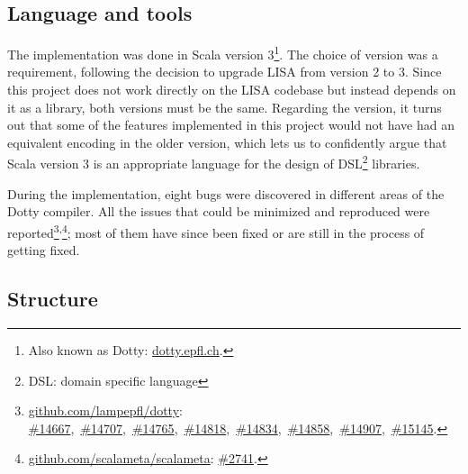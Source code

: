 \subsection{Language and tools}

The implementation was done in Scala version 3\footnote{Also known as Dotty: \href{https://dotty.epfl.ch}{dotty.epfl.ch}.}. The choice of version was a requirement, following the decision to upgrade LISA from version 2 to 3. Since this project does not work directly on the LISA codebase but instead depends on it as a library, both versions must be the same. Regarding the version, it turns out that some of the features implemented in this project would not have had an equivalent encoding in the older version, which lets us to confidently argue that Scala version 3 is an appropriate language for the design of DSL\footnote{DSL: domain specific language} libraries.

During the implementation, eight bugs were discovered in different areas of the Dotty compiler. All the issues that could be minimized and reproduced were reported\footnote{
\href{https://github.com/lampepfl/dotty}{github.com/lampepfl/dotty}:
\href{https://github.com/lampepfl/dotty/issues/14667}{\#14667},\
\href{https://github.com/lampepfl/dotty/issues/14707}{\#14707},\
\href{https://github.com/lampepfl/dotty/issues/14765}{\#14765},\
\href{https://github.com/lampepfl/dotty/issues/14818}{\#14818},\
\href{https://github.com/lampepfl/dotty/issues/14834}{\#14834},\
\href{https://github.com/lampepfl/dotty/issues/14858}{\#14858},\
\href{https://github.com/lampepfl/dotty/issues/14907}{\#14907},\
\href{https://github.com/lampepfl/dotty/issues/15145}{\#15145}.
}\textsuperscript{,}\footnote{
\href{https://github.com/scalameta/scalameta}{github.com/scalameta/scalameta}:
\href{https://github.com/scalameta/scalameta/issues/2741}{\#2741}.
}; most of them have since been fixed or are still in the process of getting fixed.

\subsection{Structure}

